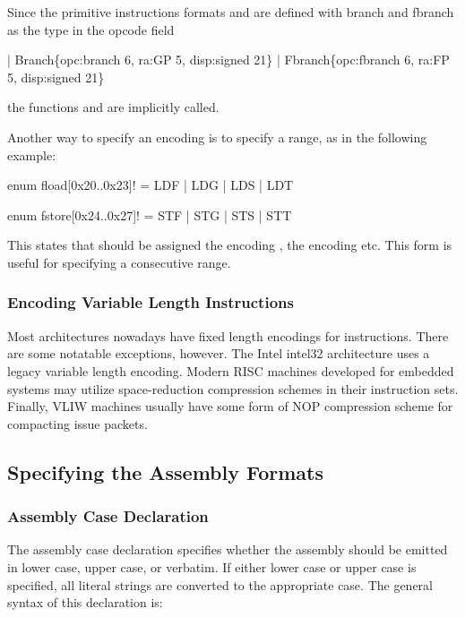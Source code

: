 Since the primitive instructions formats  and 
are defined with branch and fbranch as the type in the opcode field
\begin{SML}
   | Branch\{opc:branch 6, ra:GP 5, disp:signed 21\}          
   | Fbranch\{opc:fbranch 6, ra:FP 5, disp:signed 21\}       
\end{SML}
the functions  and  are implicitly
called.

 
Another way to specify an encoding is to specify a range, as 
in the following example:
\begin{SML}
   enum fload[0x20..0x23]! = LDF | LDG | LDS | LDT

   enum fstore[0x24..0x27]! = STF | STG | STS | STT
\end{SML}

This states that  should be assigned the encoding ,
 the encoding  etc.  This form is useful for 
specifying a consecutive range.

\subsubsection{Encoding Variable Length Instructions}

   Most architectures nowadays have fixed length encodings for instructions.  
There are some notatable exceptions, however.  
The Intel intel32 architecture uses a legacy
variable length encoding.   Modern RISC machines developed for 
embedded systems may utilize space-reduction compression schemes in their
instruction sets.  Finally, VLIW machines usually have some form
of NOP compression scheme for compacting issue packets. 

\subsection{Specifying the Assembly Formats}

\subsubsection{Assembly Case Declaration}  

  The assembly case declaration specifies whether the assembly should be
emitted in lower case, upper case, or verbatim.  If either lower case
or upper case is specified, all literal strings are converted to the 
appropriate case.  The general syntax of this declaration is:

